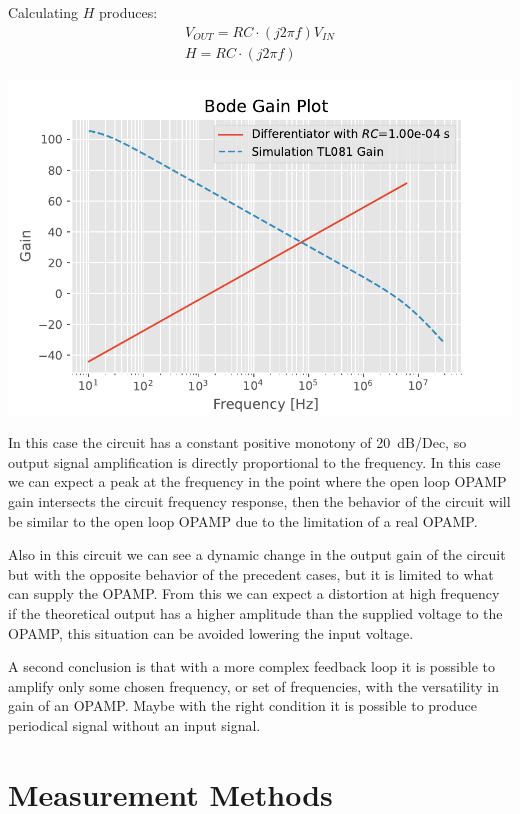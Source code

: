 \documentclass[a4paper, twocolumn]{article}
\begin{document}
Calculating \(H\) produces:
\begin{gather}
    V_{OUT}=RC\cdot(j2\pi f)V_{IN}\\
    H = RC\cdot(j2\pi f)
\end{gather}

\begin{center}
    \includegraphics[width=\columnwidth]{def_graph/DifferentiatorBodeTheo.pdf}
    \label{fig:DiffBodeGraphTheo}
\end{center}

In this case the circuit has a constant positive monotony of \SI{20}{\deci\bel/Dec}, so output signal amplification is directly proportional to the frequency. In this case we can expect a peak at the frequency in the point where the open loop OPAMP gain intersects the circuit frequency response, then the behavior of the circuit will be similar to the open loop OPAMP due to the limitation of a real OPAMP.

Also in this circuit we can see a dynamic change in the output gain of the circuit but with the opposite behavior of the precedent cases, but it is limited to what can supply the OPAMP. From this we can expect a distortion at high frequency if the theoretical output has a higher amplitude than the supplied voltage to the OPAMP, this situation can be avoided lowering the input voltage. 

A second  conclusion is that with a more complex feedback loop it is possible to amplify only some chosen frequency, or set of frequencies,  with the versatility in gain of an OPAMP. Maybe with the right condition it is possible to produce periodical signal without an input signal.

\section{Measurement Methods}
\end{document}
